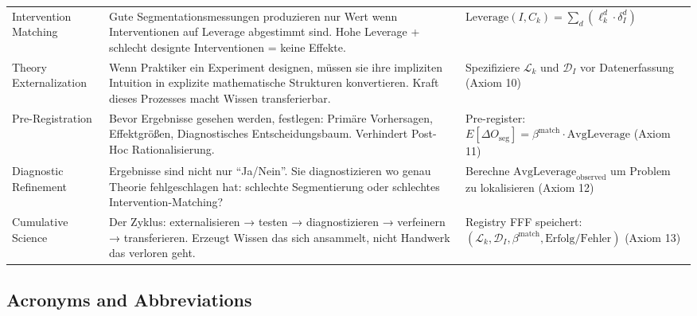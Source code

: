 \begin{center}
\begin{longtable}{@{}p{2.5cm}p{5.2cm}p{5.2cm}@{}}
Intervention Matching &
Gute Segmentationsmessungen produzieren nur Wert wenn Interventionen auf Leverage abgestimmt sind. Hohe Leverage + schlecht designte Interventionen = keine Effekte. &
$\text{Leverage}(I, C_k) = \sum_d (\ell_k^d \cdot \delta_I^d)$ \\

Theory Externalization &
Wenn Praktiker ein Experiment designen, müssen sie ihre impliziten Intuition in explizite mathematische Strukturen konvertieren. Kraft dieses Prozesses macht Wissen transferierbar. &
Spezifiziere $\mathcal{L}_k$ und $\mathcal{D}_I$ vor Datenerfassung (Axiom 10) \\

Pre-Registration &
Bevor Ergebnisse gesehen werden, festlegen: Primäre Vorhersagen, Effektgrößen, Diagnostisches Entscheidungsbaum. Verhindert Post-Hoc Rationalisierung. &
Pre-register: $E[\Delta O_{\text{seg}}] = \beta^{\text{match}} \cdot \text{AvgLeverage}$ (Axiom 11) \\

Diagnostic Refinement &
Ergebnisse sind nicht nur ``Ja/Nein''. Sie diagnostizieren wo genau Theorie fehlgeschlagen hat: schlechte Segmentierung oder schlechtes Intervention-Matching? &
Berechne $\text{AvgLeverage}_{\text{observed}}$ um Problem zu lokalisieren (Axiom 12) \\

Cumulative Science &
Der Zyklus: externalisieren → testen → diagnostizieren → verfeinern → transferieren. Erzeugt Wissen das sich ansammelt, nicht Handwerk das verloren geht. &
Registry FFF speichert: $(\mathcal{L}_k, \mathcal{D}_I, \beta^{\text{match}}, \text{Erfolg/Fehler})$ (Axiom 13) \\

\end{longtable}
\end{center}

\subsection{Acronyms and Abbreviations}

